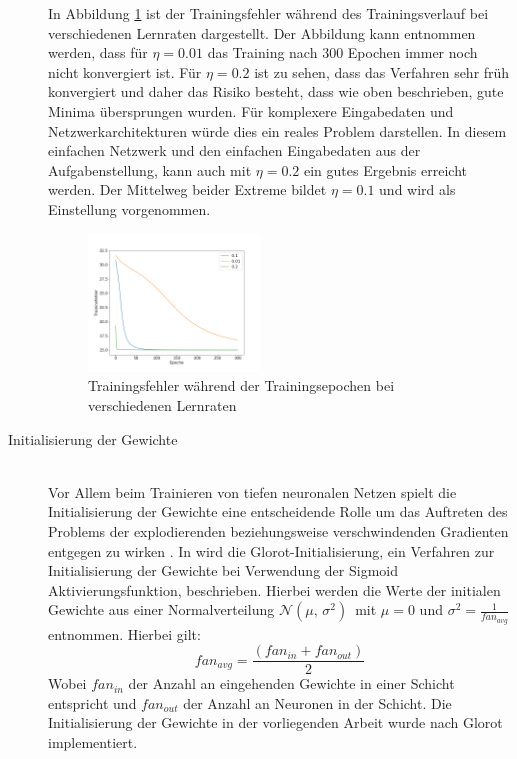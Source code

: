 \begin{description}
	In Abbildung \ref*{fig:learning_rates} ist der Trainingsfehler während des Trainingsverlauf bei verschiedenen Lernraten dargestellt. Der Abbildung kann entnommen werden, dass für $\eta=0.01$ das Training nach 300 Epochen immer noch nicht konvergiert ist. Für $\eta=0.2$ ist zu sehen, dass das Verfahren sehr früh konvergiert und daher das Risiko besteht, dass wie oben beschrieben, gute Minima übersprungen wurden. Für komplexere Eingabedaten und Netzwerkarchitekturen würde dies ein reales Problem darstellen. In diesem einfachen Netzwerk und den einfachen Eingabedaten aus der Aufgabenstellung, kann auch mit $\eta=0.2$ ein gutes Ergebnis erreicht werden. Der Mittelweg beider Extreme bildet $\eta=0.1$ und wird als Einstellung vorgenommen.
	
	\begin{figure}[ht]
		\centering
		\includegraphics[width = 0.45\textwidth]{Bilder/learning_rates.png}
		\caption{Trainingsfehler während der Trainingsepochen bei verschiedenen Lernraten}
		\label{fig:learning_rates}
	\end{figure}
	
	\item[Initialisierung der Gewichte]\hfill \\
	Vor Allem beim Trainieren von tiefen neuronalen Netzen spielt die Initialisierung der Gewichte eine entscheidende Rolle um das Auftreten des Problems der explodierenden beziehungsweise verschwindenden Gradienten entgegen zu wirken \cite{geron2017hands-on}. In \cite{Glorot10understandingthe} wird die Glorot-Initialisierung, ein Verfahren zur Initialisierung der Gewichte bei Verwendung der Sigmoid Aktivierungsfunktion, beschrieben. Hierbei werden die Werte der initialen Gewichte aus einer Normalverteilung $\mathcal{N}(\mu,\,\sigma^{2})\,$ mit $\mu = 0$ und $\sigma^{2}=\frac{1}{fan_{avg}}$ entnommen. Hierbei gilt: 
	\[
	fan_{avg}=\frac{(fan_{in}+fan_{out})}{2}
	\]
	Wobei $fan_{in}$ der Anzahl an eingehenden Gewichte in einer Schicht entspricht und  $fan_{out}$ der Anzahl an Neuronen in der Schicht. Die Initialisierung der Gewichte in der vorliegenden Arbeit wurde  nach Glorot implementiert.


\end{description}
